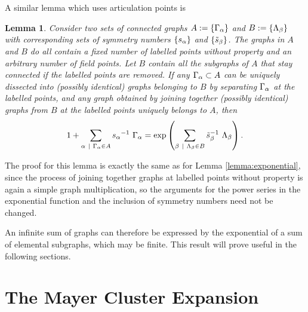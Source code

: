 \documentclass[8.5pt,twoside,twocolumn]{article}
\theoremstyle{standard}
\newtheorem{lem}[theo]{Lemma}
\begin{document}
A similar lemma which uses articulation points is
\begin{lem}
\label{lemma:articulation}
Consider two sets of connected graphs $A:=\left\{{\Gamma_{\alpha}} \right\}$ and $B:=\left\{{\Lambda_{\beta}} \right\}$
with corresponding sets of symmetry numbers $\left\{{s_{\alpha}} \right\}$ and $\left\{{\tilde s_{\beta}} \right\}$. The graphs in $A$ and $B$
do all contain a fixed number of labelled points without property and an arbitrary number
of field points. Let $B$ contain all the subgraphs of $A$ that stay connected if the labelled
points are removed. If any $\Gamma_{\alpha} \subset A$ can be uniquely dissected into (possibly identical) graphs belonging to $B$ by
separating $\Gamma_{\alpha}$ at the labelled points, and any graph obtained by joining together
(possibly identical) graphs from $B$ at the labelled points uniquely belongs to $A$, then
\begin{equation}
1 + \sum_{\alpha\ |\ \Gamma_{\alpha} \in A} {s_{\alpha}}^{-1}\ \Gamma_{\alpha} = \exp\left(\sum_{\beta\ |\ \Lambda_{\beta} \in B} {\tilde s_{\beta}}^{-1}\ \Lambda_{\beta} \right).
\label{Lemma6:eq}
\end{equation}
\end{lem}
The proof for this lemma is exactly the same as for Lemma \ref{lemma:exponential}, since the process of
joining together graphs at labelled points without property is again a simple graph multiplication,
so the arguments for the power series in the exponential function and the inclusion of symmetry
numbers need not be changed.  

An infinite sum of graphs can therefore be expressed by the exponential of a sum of elemental
subgraphs, which may be finite. This result will prove useful in the following sections.

\section{The Mayer Cluster Expansion}
\label{MCE}
\end{document}
